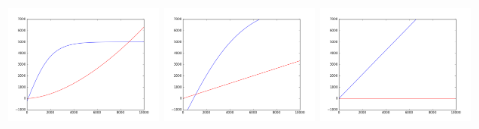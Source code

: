 \documentclass{article}
\begin{document}
\includegraphics[width=4cm, height=5cm]{figure_1}
\includegraphics[width=4cm, height=5cm]{figure_2}
\includegraphics[width=4cm, height=5cm]{figure_3}
\end{document}
